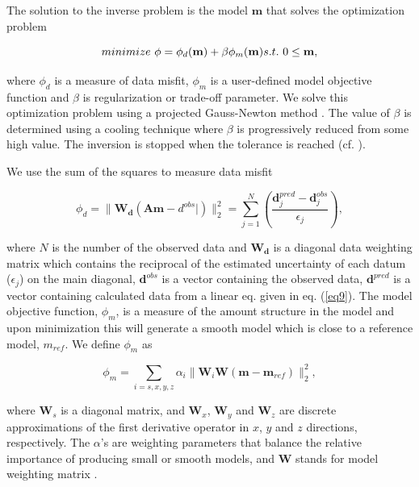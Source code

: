 \documentclass[letterpaper,11pt]{article}
\begin{document}
The solution to the inverse problem is the model $\mathbf{m}$ that solves the optimization problem
\begin{linenomath*}
\begin{equation}
  minimize \ \phi =  \phi_d(\mathbf{m}) + \beta\phi_m(\mathbf{m}) \\
  s.t. \ 0 \le \mathbf{m},
  \label{eq10}
\end{equation}
\end{linenomath*}
where $\phi_d$ is a measure of data misfit, $\phi_m$ is a user-defined model objective function and $\beta$ is regularization or trade-off parameter. We solve this optimization problem using a projected Gauss-Newton method \cite[]{Kelley}. 
The value of $\beta$ is determined using a cooling technique where $\beta$ is progressively reduced from some high value. The inversion is stopped when the tolerance is reached (cf. \cite{DougTutorial, Kang2014}). 

We use the sum of the squares to measure data misfit
\begin{linenomath*}
\begin{equation}
  \phi_d = \| \mathbf{W_d}(\mathbf{A}\mathbf{m}-d^{obs}|)\|^2_2 =
  \sum^N_{j=1}(\frac{\mathbf{d}^{pred}_j-\mathbf{d}^{obs}_j}{\epsilon_j}),
  \label{eq11}
\end{equation}
\end{linenomath*}
where $N$ is the number of the observed data and $\mathbf{W_d}$ is a diagonal data weighting matrix which contains the reciprocal of the estimated uncertainty of each datum ($\epsilon_j$) on the main diagonal,  $\mathbf{d}^{obs}$ is a vector containing the observed data, $\mathbf{d}^{pred}$ is a vector containing calculated data from a linear eq. given in eq. (\ref{eq9}).
The model objective function, $\phi_m$, is a measure of the amount structure in the model and upon minimization this will generate a smooth model which is close to a reference model, $m_{ref}$. 
We define $\phi_m$ as
\begin{linenomath*}
\begin{equation}
  \phi_m = \sum_{i=s,x,y,z} \alpha_i\| \mathbf{W}_i\mathbf{W}(\mathbf{m}-\mathbf{m}_{ref})\|^2_2,
  \label{eq12}
\end{equation}
\end{linenomath*}
where $\mathbf{W}_s$ is a diagonal matrix, and $\mathbf{W}_x$, $\mathbf{W}_y$ and $\mathbf{W}_z$ are discrete approximations of the first derivative operator in $x$, $y$ and $z$ directions, respectively.  
The $\alpha$'s are weighting parameters that balance the relative importance of producing small or smooth models, and $\mathbf{W}$ stands for model weighting matrix \cite[]{LiMag3D}.
\end{document}
